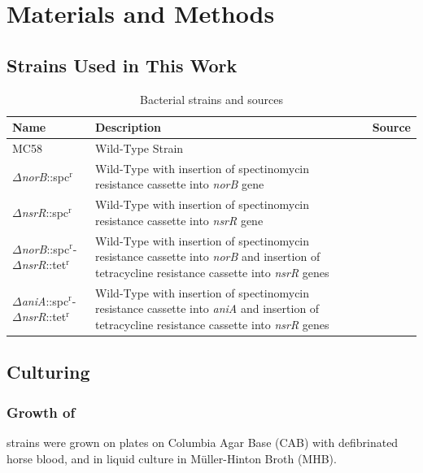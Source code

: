 \chapter{Materials and Methods}
\label{chap:matandmeth}
\section{\Nsm{} Strains Used in This Work}
\begin{table}[ht]
\begin{center}
\begin{tabular}{>{\centering}m{4.4cm}m{6.4cm}>{\centering}m{3.1cm}}
\toprule
\textbf{Name} & \centering \textbf{Description} & \textbf{Source}
\tabularnewline
\midrule
MC58 & Wild-Type Strain & \citet{McGuinness1990}
\tabularnewline\noalign{\smallskip}\hline\noalign{\smallskip}
$\Delta$\textit{norB}::spc$^\textrm{r}$\nomenclature{spc$^\textrm{r}$}{Spectinomycin resistance} & Wild-Type with insertion of spectinomycin resistance cassette into \textit{norB} gene & \citet{Heurlier2008}
\tabularnewline\noalign{\smallskip}\hline\noalign{\smallskip}
$\Delta$\textit{nsrR}::spc$^\textrm{r}$ & Wild-Type with insertion of spectinomycin resistance cassette into \textit{nsrR} gene & \citet{Rock2007}
\tabularnewline\noalign{\smallskip}\hline\noalign{\smallskip}
$\Delta$\textit{norB}::spc$^\textrm{r}$-$\Delta$\textit{nsrR}::tet$^\textrm{r}$\nomenclature{tet$^\textrm{r}$}{tetracycline resistance} & Wild-Type with insertion of spectinomycin resistance cassette into \textit{norB} and insertion of tetracycline resistance cassette into \textit{nsrR} genes & \citet{Heurlier2008}
\tabularnewline\noalign{\smallskip}\hline\noalign{\smallskip}
$\Delta$\textit{aniA}::spc$^\textrm{r}$-$\Delta$\textit{nsrR}::tet$^\textrm{r}$ & Wild-Type with insertion of spectinomycin resistance cassette into \textit{aniA} and insertion of tetracycline resistance cassette into \textit{nsrR} genes & \citet{Heurlier2008}
\tabularnewline
\bottomrule
\end{tabular}
\end{center}
\caption{Bacterial strains and sources
\label{tab:bacterial-strains}}
\end{table}

\section{Culturing \Nsm{}}
\subsection{Growth of \Nsm{}}
\Nm{} strains were grown on plates on Columbia Agar Base (CAB) with defibrinated horse blood, and in liquid culture in M\"uller-Hinton Broth (MHB).

